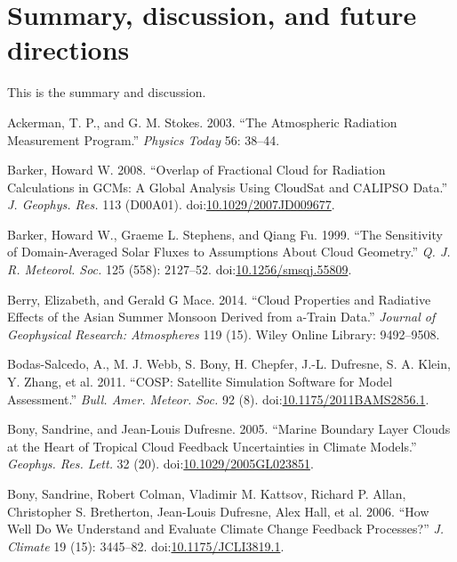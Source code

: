 \section{Summary, discussion, and future
directions}\label{summary-discussion-and-future-directions}

This is the summary and discussion.

\hypertarget{refs}{}
\hypertarget{ref-ackermanux5fandux5fstokesux5f2003}{}
Ackerman, T. P., and G. M. Stokes. 2003. ``The Atmospheric Radiation
Measurement Program.'' \emph{Physics Today} 56: 38--44.

\hypertarget{ref-barkerux5f2008}{}
Barker, Howard W. 2008. ``Overlap of Fractional Cloud for Radiation
Calculations in GCMs: A Global Analysis Using CloudSat and CALIPSO
Data.'' \emph{J. Geophys. Res.} 113 (D00A01).
doi:\href{https://doi.org/10.1029/2007JD009677}{10.1029/2007JD009677}.

\hypertarget{ref-barkerux5fetux5falux5f1999}{}
Barker, Howard W., Graeme L. Stephens, and Qiang Fu. 1999. ``The
Sensitivity of Domain-Averaged Solar Fluxes to Assumptions About Cloud
Geometry.'' \emph{Q. J. R. Meteorol. Soc.} 125 (558): 2127--52.
doi:\href{https://doi.org/10.1256/smsqj.55809}{10.1256/smsqj.55809}.

\hypertarget{ref-berryux5fandux5fmaceux5f2014}{}
Berry, Elizabeth, and Gerald G Mace. 2014. ``Cloud Properties and
Radiative Effects of the Asian Summer Monsoon Derived from a-Train
Data.'' \emph{Journal of Geophysical Research: Atmospheres} 119 (15).
Wiley Online Library: 9492--9508.

\hypertarget{ref-bodas-salcedoux5fetux5falux5f2011}{}
Bodas-Salcedo, A., M. J. Webb, S. Bony, H. Chepfer, J.-L. Dufresne, S.
A. Klein, Y. Zhang, et al. 2011. ``COSP: Satellite Simulation Software
for Model Assessment.'' \emph{Bull. Amer. Meteor. Soc.} 92 (8).
doi:\href{https://doi.org/10.1175/2011BAMS2856.1}{10.1175/2011BAMS2856.1}.

\hypertarget{ref-bonyux5fandux5fdufresneux5f2005}{}
Bony, Sandrine, and Jean-Louis Dufresne. 2005. ``Marine Boundary Layer
Clouds at the Heart of Tropical Cloud Feedback Uncertainties in Climate
Models.'' \emph{Geophys. Res. Lett.} 32 (20).
doi:\href{https://doi.org/10.1029/2005GL023851}{10.1029/2005GL023851}.

\hypertarget{ref-bonyux5fetux5falux5f2006}{}
Bony, Sandrine, Robert Colman, Vladimir M. Kattsov, Richard P. Allan,
Christopher S. Bretherton, Jean-Louis Dufresne, Alex Hall, et al. 2006.
``How Well Do We Understand and Evaluate Climate Change Feedback
Processes?'' \emph{J. Climate} 19 (15): 3445--82.
doi:\href{https://doi.org/10.1175/JCLI3819.1}{10.1175/JCLI3819.1}.

